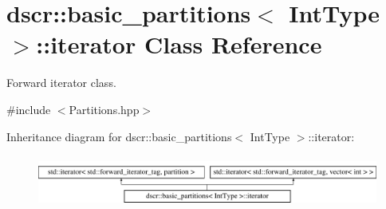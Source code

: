 \hypertarget{classdscr_1_1basic__partitions_1_1iterator}{\section{dscr\-:\-:basic\-\_\-partitions$<$ Int\-Type $>$\-:\-:iterator Class Reference}
\label{classdscr_1_1basic__partitions_1_1iterator}
}


Forward iterator class.  




{\ttfamily \#include $<$Partitions.\-hpp$>$}

Inheritance diagram for dscr\-:\-:basic\-\_\-partitions$<$ Int\-Type $>$\-:\-:iterator\-:\begin{figure}[H]
\begin{center}
\leavevmode
\includegraphics[height=1.723077cm]{classdscr_1_1basic__partitions_1_1iterator}
\end{center}
\end{figure}
